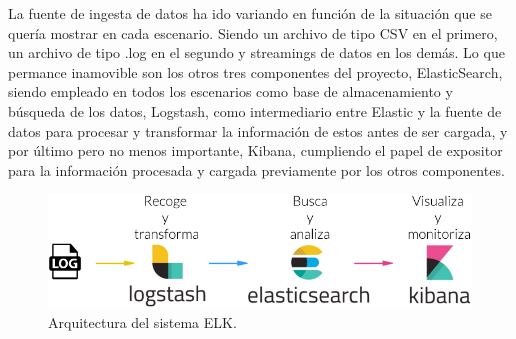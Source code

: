 La fuente de ingesta de datos ha ido variando en función de la situación que se quería mostrar en cada escenario. Siendo un archivo de tipo CSV en el primero, un archivo de tipo .log en el segundo y streamings de datos en los demás. Lo que permance inamovible son los otros tres componentes del proyecto, ElasticSearch, siendo empleado en todos los escenarios como base de almacenamiento y búsqueda de los datos, Logstash, como intermediario entre Elastic y la fuente de datos para procesar y transformar la información de estos antes de ser cargada, y por último pero no menos importante, Kibana, cumpliendo el papel de expositor para la información procesada y cargada previamente por los otros componentes.

\begin{figure}
    \centering
    \includegraphics[width=1\linewidth]{img/elk.jpg}
    \caption{Arquitectura del sistema ELK.}
    \label{fig:elk}
\end{figure}
